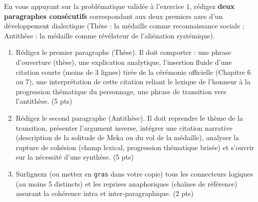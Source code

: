 \documentclass[11pt]{article}
\begin{document}
\begin{exercice}
En vous appuyant sur la problématique validée à l'exercice 1, rédigez \textbf{deux paragraphes consécutifs} correspondant aux deux premiers axes d'un développement dialectique (Thèse : la médaille comme reconnaissance sociale ; Antithèse : la médaille comme révélateur de l'aliénation systémique).

\begin{enumerate}
    \item Rédigez le premier paragraphe (Thèse). Il doit comporter : une phrase d'ouverture (thèse), une explication analytique, l'insertion fluide d'une citation courte (moins de 3 lignes) tirée de la cérémonie officielle (Chapitre 6 ou 7), une interprétation de cette citation reliant le lexique de l'honneur à la progression thématique du personnage, une phrase de transition vers l'antithèse. (5 pts)
    \item Rédigez le second paragraphe (Antithèse). Il doit reprendre le thème de la transition, présenter l'argument inverse, intégrer une citation narrative (description de la solitude de Meka ou du vol de la médaille), analyser la rupture de cohésion (champ lexical, progression thématique brisée) et s'ouvrir sur la nécessité d'une synthèse. (5 pts)
    \item Surlignezz (ou mettez en \texttt{gras} dans votre copie) tous les connecteurs logiques (au moins 5 distincts) et les reprises anaphoriques (chaînes de référence) assurant la cohérence intra et inter-paragraphique. (2 pts)
\end{enumerate}
\end{exercice}
\end{document}
